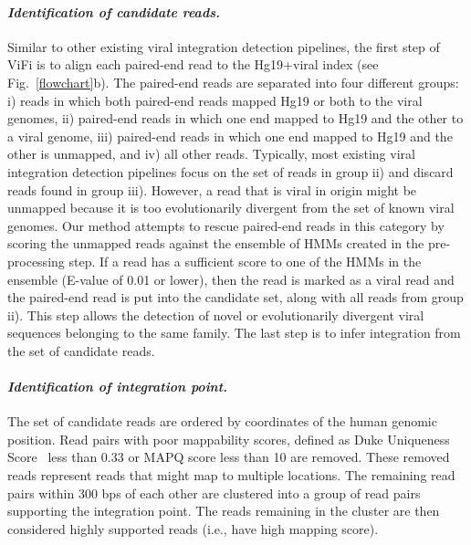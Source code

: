 \documentclass[11pt]{article}
\begin{document}
\paragraph{\emph{Identification of candidate reads.}} Similar to other existing viral integration detection pipelines, the first step of ViFi is to align each paired-end read to the Hg19+viral index (see Fig.~\ref{flowchart}b).  The paired-end reads are separated into four different groups: i) reads in which both paired-end reads mapped Hg19 or both to the viral genomes, ii) paired-end reads in which one end mapped to Hg19 and the other to a viral genome, iii) paired-end reads in which one end mapped to Hg19 and the other is unmapped, and iv) all other reads.  Typically, most existing viral integration detection pipelines focus on the set of reads in group ii) and discard reads found in group iii).  However, a read that is viral in origin might be unmapped because it is too evolutionarily divergent from the set of known viral genomes.  Our method attempts to rescue paired-end reads in this category by scoring the unmapped reads against the ensemble of HMMs created in the pre-processing step.  If a read has a sufficient score to one of the HMMs in the ensemble (E-value of 0.01 or lower), then the read is marked as a viral read and the paired-end read is put into the candidate set, along with all reads from group ii).  This step allows the detection of novel or evolutionarily divergent viral sequences belonging to the same family.  The last step is to infer integration from the set of candidate reads.  

\paragraph{\emph{Identification of integration point.}}  The set of candidate reads are ordered by coordinates of the human genomic position.  Read pairs with poor mappability scores, defined as Duke Uniqueness Score~\cite{unknown} less than 0.33 or MAPQ score less than 10 are removed.  These removed reads represent reads that might map to multiple locations.  The remaining read pairs within 300 bps of each other are clustered into a group of read pairs supporting the integration point.  The reads remaining in the cluster are then considered highly supported reads (i.e., have high mapping score).  

\end{document}
